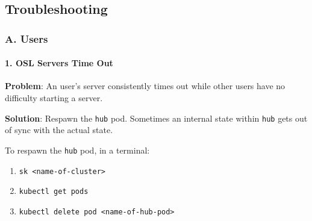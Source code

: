 \subsection{Troubleshooting}

\subsubsection{A. Users}

\paragraph{1. OSL Servers Time Out}

\textbf{Problem}: An user's server consistently times out while other users have no difficulty starting a server.

\textbf{Solution}: Respawn the \texttt{hub} pod. Sometimes an internal state within \texttt{hub} gets out of sync with the actual state.

To respawn the \texttt{hub} pod, in a terminal:

\begin{enumerate}
\item \texttt{sk \textless name-of-cluster\textgreater }
\item \texttt{kubectl get pods}
\item \texttt{kubectl delete pod \textless name-of-hub-pod\textgreater }
\end{enumerate}